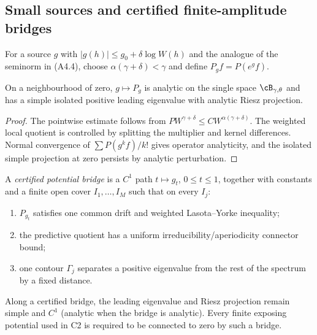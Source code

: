 \subsection{Small sources and certified finite-amplitude bridges}

For a source $g$ with
$|g(h)|\le g_0+\delta\log W(h)$ and the analogue of the seminorm in (A4.4),
choose $\alpha(\gamma+\delta)<\gamma$ and define
$P_gf=P(e^gf)$.

\begin{theorem}
\label{thm:r31-a4-local-fk}
On a neighbourhood of zero, $g\mapsto P_g$ is analytic on the single space
$\cB_{\gamma,\theta}$ and has a simple isolated positive leading eigenvalue
with analytic Riesz projection.
\end{theorem}

\begin{proof}
The pointwise estimate follows from
$P W^{\gamma+\delta}\le C W^{\alpha(\gamma+\delta)}$.
The weighted local quotient is controlled by splitting the multiplier and
kernel differences.  Normal convergence of
$\sum P(g^kf)/k!$ gives operator analyticity, and the isolated simple
projection at zero persists by analytic perturbation.
\end{proof}

A \emph{certified potential bridge} is a $C^1$ path
$t\mapsto g_t$, $0\le t\le1$, together with constants and a finite open cover
$I_1,\ldots,I_M$ such that on every $I_j$:

\begin{enumerate}[label=(B\arabic*)]
\item $P_{g_t}$ satisfies one common drift and weighted Lasota--Yorke
      inequality;
\item the predictive quotient has a uniform irreducibility/aperiodicity
      connector bound;
\item one contour $\Gamma_j$ separates a positive eigenvalue from the rest of
      the spectrum by a fixed distance.
\end{enumerate}

\begin{theorem}
\label{thm:r31-a4-bridge}
Along a certified bridge, the leading eigenvalue and Riesz projection remain
simple and $C^1$ (analytic when the bridge is analytic).  Every finite
exposing potential used in C2 is required to be connected to zero by such a
bridge.
\end{theorem}

